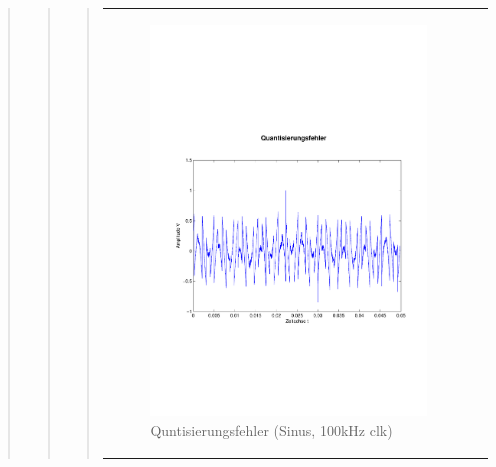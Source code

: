 \begin{quote}
\begin{quote}
\begin{quote}
            
            
            \begin{center}
                \begin{tabular}{ll}
                
                \hspace{-4cm}
                    
                    \begin{minipage}{0.55\textwidth}
                        \begin{figure}[H]
                            \includegraphics[scale=0.4, trim = 0cm 7cm 0cm
                            7.5cm, clip]
                            {./Bilder/sin8_Quantisierungsfehler}
                              \caption{Quntisierungsfehler (Sinus, 100kHz clk)}
                        \end{figure}
                    \end{minipage}
                                  

\end{tabular}
\end{center}
\end{quote}
\end{quote}
\end{quote}
